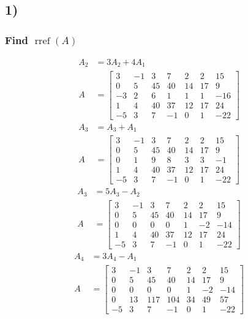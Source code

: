 \documentclass{article}
\DeclareMathOperator{\rref}{rref}
\begin{document}
\subsection{1)}

\subsubsection{Find $ \rref(A) $}
\begin{align*}
	A_2 & = 3A_2 + 4A_1 \\
	A & = \begin{bmatrix}
		3 & -1 & 3 & 7 & 2 & 2 & 15 \\
		0 & 5 & 45 & 40 & 14 & 17 & 9 \\
		-3 & 2 & 6 & 1 & 1 & 1 & -16 \\
		1 & 4 & 40 & 37 & 12 & 17 & 24 \\
		-5 & 3 & 7 & -1 & 0 & 1 & -22
	\end{bmatrix}
\end{align*}
\begin{align*}
	A_3 & = A_3 + A_1 \\
	A & = \begin{bmatrix}
		3 & -1 & 3 & 7 & 2 & 2 & 15 \\
		0 & 5 & 45 & 40 & 14 & 17 & 9 \\
		0 & 1 & 9 & 8 & 3 & 3 & -1 \\
		1 & 4 & 40 & 37 & 12 & 17 & 24 \\
		-5 & 3 & 7 & -1 & 0 & 1 & -22
	\end{bmatrix}
\end{align*}
\begin{align*}
	A_3 & = 5A_3 - A_2 \\
	A & = \begin{bmatrix}
		3 & -1 & 3 & 7 & 2 & 2 & 15 \\
		0 & 5 & 45 & 40 & 14 & 17 & 9 \\
		0 & 0 & 0 & 0 & 1 & -2 & -14 \\
		1 & 4 & 40 & 37 & 12 & 17 & 24 \\
		-5 & 3 & 7 & -1 & 0 & 1 & -22
	\end{bmatrix}
\end{align*}
\begin{align*}
	A_4 & = 3A_4 - A_1 \\
	A & = \begin{bmatrix}
		3 & -1 & 3 & 7 & 2 & 2 & 15 \\
		0 & 5 & 45 & 40 & 14 & 17 & 9 \\
		0 & 0 & 0 & 0 & 1 & -2 & -14 \\
		0 & 13 & 117 & 104 & 34 & 49 & 57 \\
		-5 & 3 & 7 & -1 & 0 & 1 & -22
	\end{bmatrix}
\end{align*}
\end{document}
